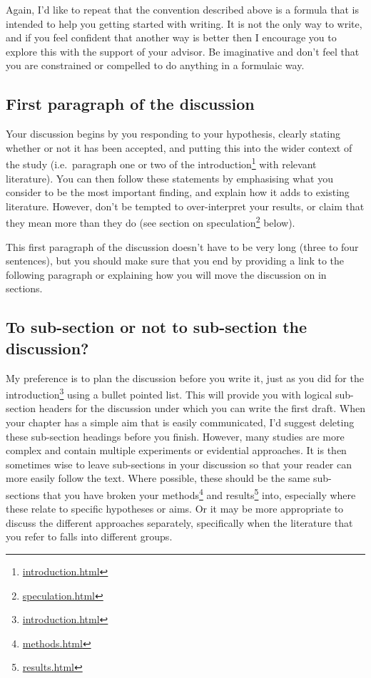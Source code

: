 \documentclass[
]{krantz}
\renewcommand{\href}[2]{#2\footnote{\url{#1}}}
\begin{document}
Again, I'd like to repeat that the convention described above is a formula that is intended to help you getting started with writing. It is not the only way to write, and if you feel confident that another way is better then I encourage you to explore this with the support of your advisor. Be imaginative and don't feel that you are constrained or compelled to do anything in a formulaic way.

\hypertarget{first-paragraph-of-the-discussion}{%
\subsection{First paragraph of the discussion}\label{first-paragraph-of-the-discussion}}

Your discussion begins by you responding to your hypothesis, clearly stating whether or not it has been accepted, and putting this into the wider context of the study (i.e.~paragraph one or two of the \href{introduction.html}{introduction} with relevant literature). You can then follow these statements by emphasising what you consider to be the most important finding, and explain how it adds to existing literature. However, don't be tempted to over-interpret your results, or claim that they mean more than they do (\href{speculation.html}{see section on speculation} below).

This first paragraph of the discussion doesn't have to be very long (three to four sentences), but you should make sure that you end by providing a link to the following paragraph or explaining how you will move the discussion on in sections.

\hypertarget{to-sub-section-or-not-to-sub-section-the-discussion}{%
\subsection{To sub-section or not to sub-section the discussion?}\label{to-sub-section-or-not-to-sub-section-the-discussion}}

My preference is to plan the discussion before you write it, just as you did for the \href{introduction.html}{introduction} using a bullet pointed list. This will provide you with logical sub-section headers for the discussion under which you can write the first draft. When your chapter has a simple aim that is easily communicated, I'd suggest deleting these sub-section headings before you finish. However, many studies are more complex and contain multiple experiments or evidential approaches. It is then sometimes wise to leave sub-sections in your discussion so that your reader can more easily follow the text. Where possible, these should be the same sub-sections that you have broken your \href{methods.html}{methods} and \href{results.html}{results} into, especially where these relate to specific hypotheses or aims. Or it may be more appropriate to discuss the different approaches separately, specifically when the literature that you refer to falls into different groups.
\end{document}
